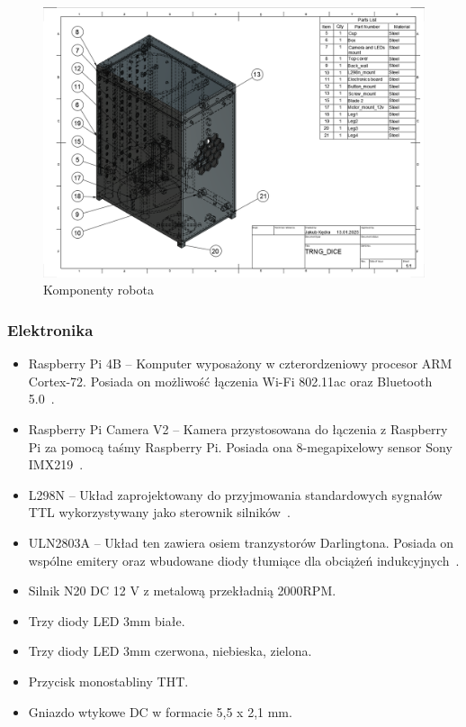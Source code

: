     \begin{figure}[H]
        \centering
        \includegraphics[width=0.95\linewidth]{chapters/03-praca-wlasna/figures/komponenty}
        \caption{\label{fig:komponenty}Komponenty robota}
    \end{figure}

\subsubsection{Elektronika}
    \begin{itemize}
        \item Raspberry Pi 4B -- Komputer wyposażony w czterordzeniowy procesor ARM Cortex-72. Posiada on możliwość łączenia Wi-Fi 802.11ac oraz Bluetooth 5.0~\cite{malina}.
        \item Raspberry Pi Camera V2 -- Kamera przystosowana do łączenia z Raspberry Pi za pomocą taśmy Raspberry Pi. Posiada ona 8-megapixelowy sensor Sony IMX219~\cite{malina}.
        \item L298N -- Układ zaprojektowany do przyjmowania standardowych sygnałów TTL wykorzystywany jako sterownik silników~\cite{L298}.
        \item ULN2803A -- Układ ten zawiera osiem tranzystorów Darlingtona. Posiada on wspólne emitery oraz wbudowane diody tłumiące dla obciążeń indukcyjnych~\cite{ULN2803a}.
        \item Silnik N20 DC 12 V z metalową przekładnią 2000RPM.
        \item Trzy diody LED 3mm białe.
        \item Trzy diody LED 3mm czerwona, niebieska, zielona.
        \item Przycisk monostabliny THT.
        \item Gniazdo wtykowe DC w formacie 5,5 x 2,1 mm.
    \end{itemize}


